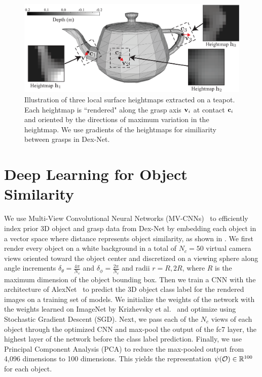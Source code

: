 \begin{figure}[t!]
\centering
\includegraphics[scale=0.30]{figures/illustrations/local_feature_model.eps}
\caption{Illustration of three local surface heightmaps extracted on a teapot. Each heightmap is ``rendered" along the grasp axis $\mathbf{v}_i$ at contact $\mathbf{c}_i$ and oriented by the directions of maximum variation in the heightmap.  We use gradients of the heightmaps for similiarity between grasps in Dex-Net.}
\vspace*{-15pt}
\end{figure}

\section{Deep Learning for Object Similarity}
We use Multi-View Convolutional Neural Networks (MV-CNNs)~\cite{aubry2015understanding, su2015multi} to efficiently index prior 3D object and grasp data from Dex-Net by embedding each object in a vector space where distance represents object similarity, as shown in .
We first render every object on a white background in a total of $N_c = 50$ virtual camera views oriented toward the object center and discretized on a viewing sphere along angle increments $\delta_{\theta} = \frac{4 \pi}{N_c}$ and $\delta_{\phi} = \frac{2 \pi}{N_c}$ and radii $r = R, 2R$, where $R$ is the maximum dimension of the object bounding box.
Then we train a CNN with the architecture of AlexNet~\cite{krizhevsky2012imagenet} to predict the 3D object class label for the rendered images on a training set of models. 
We initialize the weights of the network with the weights learned on ImageNet by Krizhevsky et al.~\cite{krizhevsky2012imagenet} and optimize using Stochastic Gradient Descent (SGD). 
Next, we pass each of the $N_c$ views of each object through the optimized CNN and max-pool the output of the fc7 layer, the highest layer of the network before the class label prediction. 
Finally, we use Principal Component Analysis (PCA) to reduce the max-pooled output from 4,096 dimensions to 100 dimensions.
This yields the representation $\psi(\mathcal{O}) \in \mathbb{R}^{100}$ for each object.


